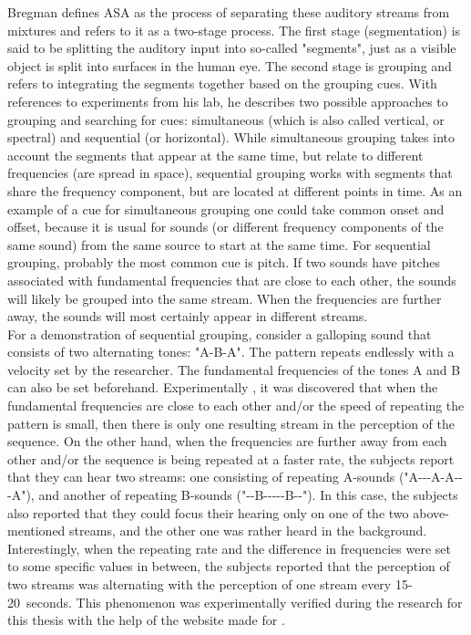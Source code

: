 Bregman defines ASA as the process of separating these auditory streams from mixtures and refers to it as a two-stage process. The first stage (segmentation) is said to be splitting the auditory input into so-called "segments", just as a visible object is split into surfaces in the human eye. The second stage is grouping and refers to integrating the segments together based on the grouping cues. With references to experiments from his lab, he describes two possible approaches to grouping and searching for cues: simultaneous (which is also called vertical, or spectral) and sequential (or horizontal). While simultaneous grouping takes into account the segments that appear at the same time, but relate to different frequencies (are spread in space), sequential grouping works with segments that share the frequency component, but are located at different points in time. As an example of a cue for simultaneous grouping one could take common onset and offset, because it is usual for sounds (or different frequency components of the same sound) from the same source to start at the same time. For sequential grouping, pro\-bab\-ly the most common cue is pitch. If two sounds have pitches associated with fundamental frequencies that are close to each other, the sounds will likely be grouped into the same stream. When the frequencies are further away, the sounds will most certainly appear in different streams.\\

For a demonstration of sequential grouping, consider a galloping sound that consists of two alternating tones: "A-B-A". The pattern repeats endlessly with a velocity set by the researcher. The fundamental frequencies of the tones A and B can also be set beforehand. Experimentally \cite{Schnupp2011}, it was discovered that when the fundamental frequencies are close to each other and/or the speed of repeating the pattern is small, then there is only one resulting stream in the perception of the sequence. On the other hand, when the frequencies are further away from each other and/or the sequence is being repeated at a faster rate, the subjects report that they can hear two streams: one consisting of repeating A-sounds ("A-{}-{}-A-A-{}-{}-A"), and another of repeating B-sounds ("-{}-B-{}-{}-{}-{}-B-{}-"). In this case, the subjects also reported that they could focus their hearing only on one of the two above-mentioned streams, and the other one was rather heard in the background. Interestingly, when the repeating rate and the difference in frequencies were set to some specific values in between, the subjects reported that the perception of two streams was alternating with the perception of one stream every 15-20~seconds. This phenomenon was experimentally verified during the research for this thesis with the help of the website made for \cite{Schnupp2011}.\\

